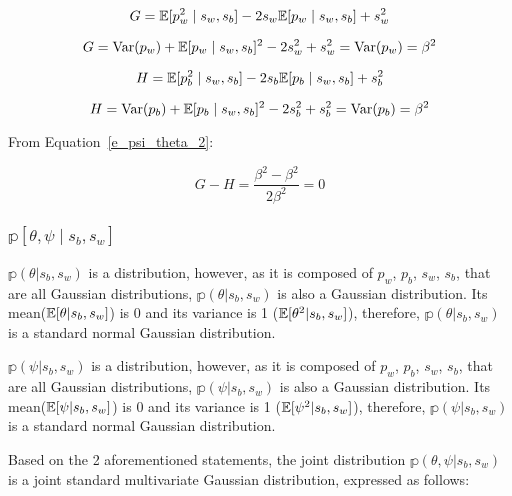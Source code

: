 \documentclass[a4paper,11pt]{article}
\theoremstyle{mytheor}
\newcommand{\E}{\Bbb{E}}
\newcommand{\Var}{\mathrm{Var}}
\begin{document}
\begin{equation}
    \label{e_psi_theta_3}
    G=\Bbb{E}[p_w^2\mid s_w,s_b] - 2s_w\Bbb{E}[p_w\mid s_w,s_b] + s_{w}^{2}
\end{equation}

\begin{equation}
    \label{e_psi_theta_4}
    G=\Var(p_w)+\E[p_w\mid s_w,s_b]^2 - 2s_w^2 + s_{w}^{2} = \Var(p_w) = \beta^2
\end{equation}

\begin{equation}
    \label{e_psi_theta_5}
    H=\Bbb{E}[p_b^2\mid s_w,s_b] - 2s_b\Bbb{E}[p_b\mid s_w,s_b] + s_{b}^{2}
\end{equation}

\begin{equation}
    \label{e_psi_theta_6}
    H=\Var(p_b)+\E[p_b\mid s_w,s_b]^2 - 2s_b^2 + s_{b}^{2} = \Var(p_b) = \beta^2
\end{equation}

From Equation~\ref{e_psi_theta_2}:

\begin{equation}
    \label{e_psi_theta_7}
    G-H= \frac{\beta^2-\beta^2}{2\beta^2}=0
\end{equation}

\subsubsection{$\mathbb{p}[\theta,\psi \mid s_b,s_w]$}

$\mathbb{p}(\theta|s_b,s_w)$ is a distribution, however, as it is composed of $p_w$, $p_b$, $s_w$, $s_b$, that are all Gaussian distributions, $\mathbb{p}(\theta|s_b,s_w)$ is also a Gaussian distribution. Its mean($\E[\theta|s_b,s_w]$) is 0 and its variance is 1 ($\E[\theta^2|s_b,s_w]$), therefore, $\mathbb{p}(\theta|s_b,s_w)$ is a standard normal Gaussian distribution.

$\mathbb{p}(\psi|s_b,s_w)$ is a distribution, however, as it is composed of $p_w$, $p_b$, $s_w$, $s_b$, that are all Gaussian distributions, $\mathbb{p}(\psi|s_b,s_w)$ is also a Gaussian distribution. Its mean($\E[\psi|s_b,s_w]$) is 0 and its variance is 1 ($\E[\psi^2|s_b,s_w]$), therefore, $\mathbb{p}(\psi|s_b,s_w)$ is a standard normal Gaussian distribution.

Based on the 2 aforementioned statements, the joint distribution $\mathbb{p}(\theta,\psi|s_b,s_w)$ is a joint standard multivariate Gaussian distribution, expressed as follows:
\end{document}
